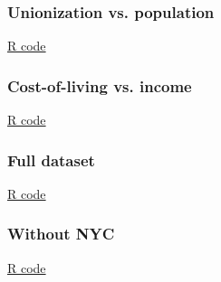 \documentclass[handout]{beamer}
\begin{document}


   \begin{frame}
   \frametitle{Unionization vs. population}
   \begin{center}
   \end{center}
   \href{http://stats191.stanford.edu/review.html}{R code}
   \end{frame}



   \begin{frame}
   \frametitle{Cost-of-living vs. income}
   \begin{center}
   \end{center}
   \href{http://stats191.stanford.edu/review.html}{R code}
   \end{frame}



   \begin{frame}
   \frametitle{Full dataset}
   \begin{center}
   \end{center}
   \href{http://stats191.stanford.edu/review.html}{R code}
   \end{frame}



   \begin{frame}
   \frametitle{Without NYC}
   \begin{center}
   \end{center}
   \href{http://stats191.stanford.edu/review.html}{R code}
   \end{frame}

\end{document}
